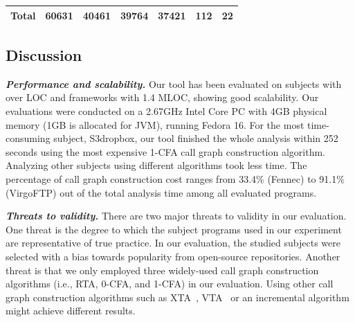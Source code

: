 \begin{table}[t]
\begin{center}
\begin{tabular}{|l||c|c|c|c|c|c|}
\hline
 \hline
 Total &  60631 &  40461 &  39764 &  37421 &  112 & 22 \\
 \hline
\end{tabular}
\end{center}
\vspace{-15pt}
\end{table}


\subsection{Discussion}

\noindent \textbf{\textit{Performance and scalability.}} Our tool
has been evaluated on \subnum subjects with over \totaloc LOC and frameworks
with 1.4 MLOC, showing good scalability. Our evaluations
were conducted on a 2.67GHz Intel Core PC with 4GB
physical memory (1GB is allocated for JVM), running Fedora 16.
For the most time-consuming subject, S3dropbox, our tool finished the whole analysis
within 252 seconds using the most expensive 1-CFA call graph construction
algorithm. Analyzing other subjects using different algorithms took less time.
The percentage of call graph construction cost ranges
from 33.4\% (Fennec) to 91.1\% (VirgoFTP) out of
the total analysis time among all evaluated programs.



\vspace{1mm}

\noindent \textbf{\textit{Threats to validity.}}
There are two major threats to validity in our evaluation. 
One threat is the degree to which the subject programs
used in our experiment are representative of true practice.
In our evaluation, the studied subjects were selected with a bias towards popularity from
open-source repositories. Another threat is that we only employed three
widely-used call graph construction algorithms (i.e., RTA, 0-CFA, and 1-CFA) 
in our evaluation. Using other 
call graph construction algorithms such as XTA~\cite{xta}, VTA~\cite{Sundaresan:2000} or
an incremental algorithm~\cite{inccg} might achieve different results.


